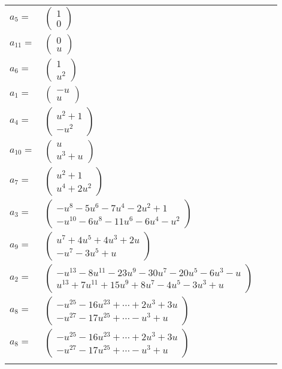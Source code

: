 \documentclass[1p]{elsarticle_modified}
\theoremstyle{definition}
\begin{document}
\begin{tabular}{m{7pt} m{180pt} m{7pt} m{180pt} }
\flushright $a_{5}=$&$\begin{pmatrix}1\\0\end{pmatrix}$ \\
\flushright $a_{11}=$&$\begin{pmatrix}0\\u\end{pmatrix}$ \\
\flushright $a_{6}=$&$\begin{pmatrix}1\\u^2\end{pmatrix}$ \\
\flushright $a_{1}=$&$\begin{pmatrix}- u\\u\end{pmatrix}$ \\
\flushright $a_{4}=$&$\begin{pmatrix}u^2+1\\- u^2\end{pmatrix}$ \\
\flushright $a_{10}=$&$\begin{pmatrix}u\\u^3+u\end{pmatrix}$ \\
\flushright $a_{7}=$&$\begin{pmatrix}u^2+1\\u^4+2 u^2\end{pmatrix}$ \\
\flushright $a_{3}=$&$\begin{pmatrix}- u^8-5 u^6-7 u^4-2 u^2+1\\- u^{10}-6 u^8-11 u^6-6 u^4- u^2\end{pmatrix}$ \\
\flushright $a_{9}=$&$\begin{pmatrix}u^7+4 u^5+4 u^3+2 u\\- u^7-3 u^5+u\end{pmatrix}$ \\
\flushright $a_{2}=$&$\begin{pmatrix}- u^{13}-8 u^{11}-23 u^9-30 u^7-20 u^5-6 u^3- u\\u^{13}+7 u^{11}+15 u^9+8 u^7-4 u^5-3 u^3+u\end{pmatrix}$ \\
\flushright $a_{8}=$&$\begin{pmatrix}- u^{25}-16 u^{23}+\cdots+2 u^3+3 u\\- u^{27}-17 u^{25}+\cdots- u^3+u\end{pmatrix}$\\ \flushright $a_{8}=$&$\begin{pmatrix}- u^{25}-16 u^{23}+\cdots+2 u^3+3 u\\- u^{27}-17 u^{25}+\cdots- u^3+u\end{pmatrix}$\\&\end{tabular}
\end{document}
